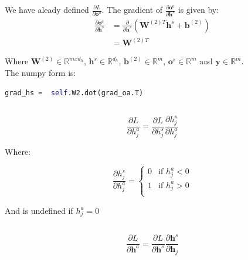 \documentclass[reqno]{amsart}
\theoremstyle{definition}
\theoremstyle{remark}
\numberwithin{equation}{section}
\begin{document}
We have aleady defined $\frac{\partial L}{\partial \mathbf{o}^a}$. The gradient of $\frac{\partial \mathbf{o}^a}{\partial \mathbf{h}^s}$ is given by:\\

\begin{align}
    \frac{\partial \mathbf{o}^a}{\partial \mathbf{h}^s} &= \frac{\partial}{\partial \mathbf{h}^s} (\mathbf{W}^{(2)T}\mathbf{h}^s +\mathbf{b}^{(2)})\\
    &= \mathbf{W}^{(2)T}
\end{align}

Where $\mathbf{W}^{(2)} \in \mathbb{R}^{m x d_h}$, $\mathbf{h}^{s} \in \mathbb{R}^{d_h}$, $\mathbf{b}^{(2)} \in \mathbb{R}^{m}$, $\mathbf{o}^{s} \in \mathbb{R}^{m}$ and $\mathbf{y} \in \mathbb{R}^{m}$.\\

The numpy form is:

\begin{lstlisting}[language=Python]
    grad_hs =  self.W2.dot(grad_oa.T)
\end{lstlisting}

\subsection{}

\begin{equation}
    \frac{\partial L}{\partial h^a_j} = \frac{\partial L}{\partial h^s_j} \frac{\partial h^s_j}{\partial h_j^a}
\end{equation}

Where: 

\begin{equation}
    \frac{\partial h_j^s}{\partial h_j^a} = 
    \begin{cases} 
    0 & \text{if  }  h_j^a < 0 \\
    1 & \text{if  }  h_j^a > 0 \\
    \end{cases}
\end{equation}

And is undefined if $h_j^a = 0$

\subsection{}

\begin{equation}
    \frac{\partial L}{\partial \mathbf{h}^a} = \frac{\partial L}{\partial \mathbf{h}^s} \frac{\partial \mathbf{h}^s}{\partial \mathbf{h}_j}
\end{equation}
\end{document}
